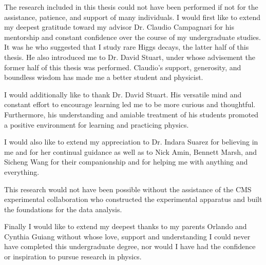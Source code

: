 \begin{acknowledgements}

The research included in this thesis could not have been performed if not for the assistance, patience, and support of many individuals.  I would first like to extend my deepest gratitude toward my advisor Dr. Claudio Campagnari for his mentorship and constant confidence over the course of my undergraduate studies. It was he who suggested that I study rare Higgs decays, the latter half of this thesis. He also introduced me to Dr. David Stuart, under whose advisement the former half of this thesis was performed. Claudio's support, generosity, and boundless wisdom has made me a better student and physicist.

I would additionally like to thank Dr. David Stuart. His versatile mind and constant effort to encourage learning led me to be more curious and thoughtful. Furthermore, his understanding and amiable treatment of his students promoted a positive environment for learning and practicing physics.

I would also like to extend my appreciation to Dr. Indara Suarez for believing in me and for her continual guidance as well as to Nick Amin, Bennett Marsh, and Sicheng Wang for their companionship and for helping me with anything and everything.

This research would not have been possible without the assistance of the CMS experimental collaboration who constructed the experimental apparatus and built the foundations for the data analysis.  

Finally I would like to extend my deepest thanks to my parents Orlando and Cynthia Guiang without whose love, support and understanding I could never have completed this undergraduate degree, nor would I have had the confidence or inspiration to pursue research in physics.

\end{acknowledgements} 